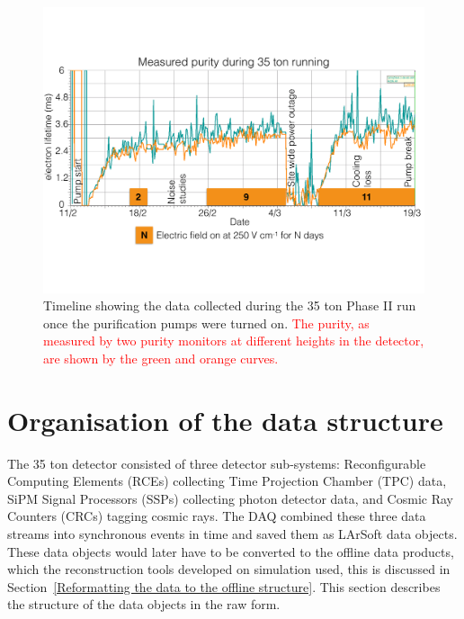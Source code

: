 \begin{figure}
  \centering
  \includegraphics[width=1.0\textwidth]{DataCollected}
  \caption[The 35 ton data sample]{Timeline showing the data collected during the 35 ton Phase II run once the purification pumps were turned on. \textcolor{red}{The purity, as measured by two purity monitors at different heights in the detector, are shown by the green and orange curves.}}
  \label{fig:DataCollected}  
\end{figure}

\section{Organisation of the data structure} \label{Organisation of the data structure} %
The 35 ton detector consisted of three detector sub-systems: Reconfigurable Computing Elements (RCEs) collecting Time Projection Chamber (TPC) data, SiPM Signal Processors (SSPs) collecting photon detector data, and Cosmic Ray Counters (CRCs) tagging cosmic rays. The DAQ combined these three data streams into synchronous events in time and saved them as LArSoft data objects. These data objects would later have to be converted to the offline data products, which the reconstruction tools developed on simulation used, this is discussed in Section~\ref{Reformatting the data to the offline structure}. This section describes the structure of the data objects in the raw form.\\

